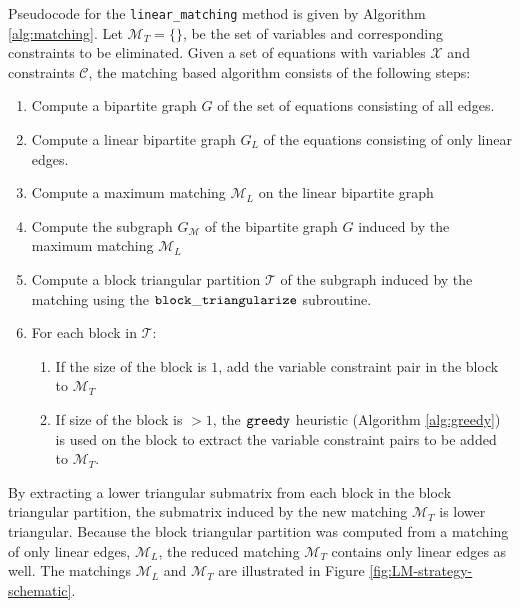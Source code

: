 \documentclass[smallextended]{svjour3}
\begin{document}
Pseudocode for the {\tt linear\_matching} method is given by Algorithm \ref{alg:matching}. Let $\mathcal{M}_T = \{\}$, be the set of variables and corresponding constraints to be eliminated. Given a set of equations with variables $\mathcal{X}$ and constraints $\mathcal{C}$, the matching based algorithm consists of the following steps:
\begin{enumerate}
    \item Compute a bipartite graph $G$ of the set of equations consisting of all edges.
    \item Compute a linear bipartite graph $G_L$ of the equations consisting of only linear edges.
    \item Compute a maximum matching $\mathcal{M}_L$ on the linear bipartite graph
    \item Compute the subgraph $G_\mathcal{M}$ of the bipartite graph $G$ induced by the maximum matching $\mathcal{M}_L$
    \item Compute a block triangular partition $\mathcal{T}$ of the subgraph induced by the matching using the $\tt block\_triangularize$ subroutine.
    \item For each block in $\mathcal{T}$:
      \begin{enumerate}
        \item If the size of the block is $1$, add the variable constraint pair in the block to $\mathcal{M}_T$
        \item If size of the block is $>1$, the $\tt greedy$ heuristic (Algorithm \ref{alg:greedy}) is used on the block to extract the variable constraint pairs to be added to $\mathcal{M}_T$.
      \end{enumerate}
\end{enumerate}
By extracting a lower triangular submatrix from each block in the block triangular partition,
the submatrix induced by the new matching $\mathcal{M}_T$ is lower triangular. Because
the block triangular partition was computed from a matching of only linear edges, $\mathcal{M}_L$,
the reduced matching $\mathcal{M}_T$ contains only linear edges as well.
The matchings $\mathcal{M}_L$ and $\mathcal{M}_T$ are illustrated in Figure \ref{fig:LM-strategy-schematic}.
\end{document}
